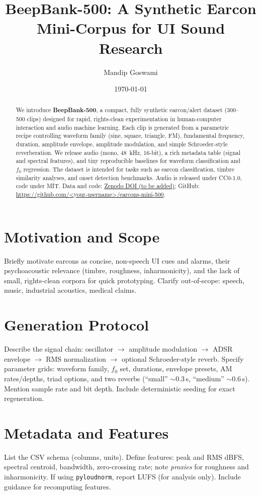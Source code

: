 \documentclass[11pt]{article}
\title{BeepBank-500: A Synthetic Earcon Mini-Corpus for UI Sound Research}
\author{Mandip Goswami}
\date{\today}
\begin{document}
\maketitle

\begin{abstract}
We introduce \textbf{BeepBank-500}, a compact, fully synthetic earcon/alert dataset (300--500 clips) designed for rapid, rights-clean experimentation in human-computer interaction and audio machine learning. Each clip is generated from a parametric recipe controlling waveform family (sine, square, triangle, FM), fundamental frequency, duration, amplitude envelope, amplitude modulation, and simple Schroeder-style reverberation. We release audio (mono, 48~kHz, 16-bit), a rich metadata table (signal and spectral features), and tiny reproducible baselines for waveform classification and $f_0$ regression. The dataset is intended for tasks such as earcon classification, timbre similarity analyses, and onset detection benchmarks. Audio is released under CC0-1.0, code under MIT. Data and code: \href{https://doi.org/10.5281/zenodo.XXXXXXX}{Zenodo DOI (to be added)}; GitHub: \url{https://github.com/<your-username>/earcons-mini-500}.
\end{abstract}

\section{Motivation and Scope}
Briefly motivate earcons as concise, non-speech UI cues and alarms, their psychoacoustic relevance (timbre, roughness, inharmonicity), and the lack of small, rights-clean corpora for quick prototyping. Clarify out-of-scope: speech, music, industrial acoustics, medical claims.

\section{Generation Protocol}
Describe the signal chain: oscillator $\to$ amplitude modulation $\to$ ADSR envelope $\to$ RMS normalization $\to$ optional Schroeder-style reverb. Specify parameter grids: waveform family, $f_0$ set, durations, envelope presets, AM rates/depths, triad options, and two reverbs (``small'' $\sim$0.3\,s, ``medium'' $\sim$0.6\,s). Mention sample rate and bit depth. Include deterministic seeding for exact regeneration.

\section{Metadata and Features}
List the CSV schema (columns, units). Define features: peak and RMS dBFS, spectral centroid, bandwidth, zero-crossing rate; note \emph{proxies} for roughness and inharmonicity. If using \texttt{pyloudnorm}, report LUFS (for analysis only). Include guidance for recomputing features.
\end{document}
